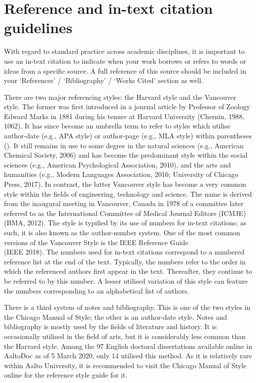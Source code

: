 \documentclass[english, 12pt, a4paper, elec, utf8, a-2b, online]{aaltothesis}
\begin{document}
\clearpage
\section{Reference and in-text citation guidelines}
\label{app:reference}

With regard to standard practice across academic disciplines, it is important to
use an in-text citation to indicate when your work borrows or refers to words or
ideas from a specific source. A full reference of this source should be included
in your ‘References’ / ‘Bibliography’ / ‘Works Cited’ section as well.

There are two major referencing styles: the Harvard style and the Vancouver 
style. The former was first introduced in a journal article by Professor of 
Zoology Edward Marks in 1881 during his tenure at Harvard University (Chernin, 
1988, 1062). It has since become an umbrella term to refer to styles which 
utilise author-date (e.g., APA style) or author-page (e.g., MLA style) within 
parentheses (). It still remains in use to some degree in the natural sciences 
(e.g., American Chemical Society, 2006) and has become the predominant style 
within the social sciences (e.g., American Psychological Association, 2010), and
the arts and humanities (e.g., Modern Languages Association, 2016; University of
Chicago Press, 2017). In contrast, the latter Vancouver style has become a very 
common style within the fields of engineering, technology and science. The name 
is derived from the inaugural meeting in Vancouver, Canada in 1978 of a 
committee later referred to as the International Committee of Medical Journal 
Editors (ICMJE) (BMA, 2012). The style is typified by its use of numbers for 
in-text citations; as such, it is also known as the author-number system. One of
the most common versions of the Vancouver Style is the IEEE Reference Guide \\
(IEEE 2018). The numbers used for in-text citations correspond to a numbered 
reference list at the end of the text. Typically, the numbers refer to the order
in which the referenced authors first appear in the text. Thereafter, they 
continue to be referred to by this number. A lesser utilised variation of this 
style can feature the numbers corresponding to an alphabetical list of authors.

There is a third system of notes and bibliography. This is one of the two styles
in the Chicago Manual of Style; the other is an author-date style. Notes and 
bibliography is mostly used by the fields of literature and history. It is 
occasionally utilised in the field of arts, but it is considerably less common 
than the Harvard style. Among the 97 English doctoral dissertations available 
online in AaltoDoc as of 5 March 2020, only 14 utilised this method. As it is 
relatively rare within Aalto University, it is recommended to visit the Chicago 
Manual of Style online for the reference style guide for it.
\end{document}
